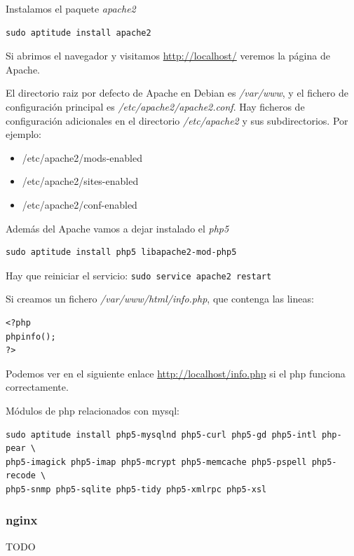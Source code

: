 \documentclass[12pt,spanish,]{scrartcl}
\providecommand{\tightlist}{%
  \setlength{\itemsep}{0pt}\setlength{\parskip}{0pt}}
\begin{document}
Instalamos el paquete \emph{apache2}

\begin{verbatim}
sudo aptitude install apache2
\end{verbatim}

Si abrimos el navegador y visitamos \url{http://localhost/} veremos la
página de Apache.

El directorio raiz por defecto de Apache en Debian es \emph{/var/www}, y
el fichero de configuración principal es
\emph{/etc/apache2/apache2.conf}. Hay ficheros de configuración
adicionales en el directorio \emph{/etc/apache2} y sus subdirectorios.
Por ejemplo:

\begin{itemize}
\tightlist
\item
  /etc/apache2/mods-enabled
\item
  /etc/apache2/sites-enabled
\item
  /etc/apache2/conf-enabled
\end{itemize}

Además del Apache vamos a dejar instalado el \emph{php5}

\begin{verbatim}
sudo aptitude install php5 libapache2-mod-php5
\end{verbatim}

Hay que reiniciar el servicio: \texttt{sudo\ service\ apache2\ restart}

Si creamos un fichero \emph{/var/www/html/info.php}, que contenga las
lineas:

\begin{verbatim}
<?php
phpinfo();
?>
\end{verbatim}

Podemos ver en el siguiente enlace \url{http://localhost/info.php} si el
php funciona correctamente.

Módulos de php relacionados con mysql:

\begin{verbatim}
sudo aptitude install php5-mysqlnd php5-curl php5-gd php5-intl php-pear \
php5-imagick php5-imap php5-mcrypt php5-memcache php5-pspell php5-recode \
php5-snmp php5-sqlite php5-tidy php5-xmlrpc php5-xsl
\end{verbatim}

\subsubsection{nginx}\label{nginx}

TODO
\end{document}
